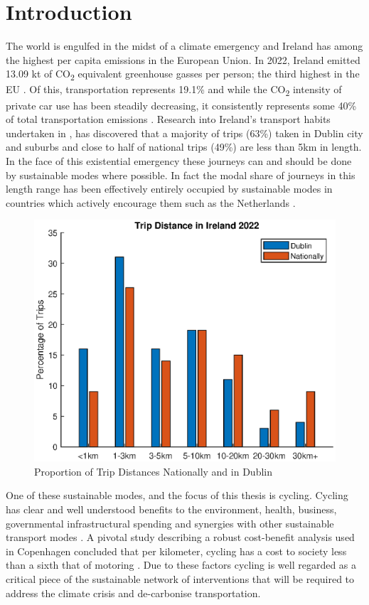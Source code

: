 \chapter{Introduction}

The world is engulfed in the midst of a climate emergency and Ireland has among the highest per capita emissions in the European Union. In 2022, Ireland emitted 13.09 kt of CO\textsubscript{2} equivalent greenhouse gasses per person; the third highest in the EU \citep{eeaEEAGreenhouseGases2024}. Of this, transportation represents 19.1\% and while the CO\textsubscript{2} intensity of private car use has been steadily decreasing, it consistently represents some 40\% of total transportation emissions \citep{walshEnergyIreland20202021}. Research into Ireland's transport habits undertaken in \citet{ntaNationalHouseholdTravel2022}, has discovered that a majority of trips (63\%) taken in Dublin city and suburbs and close to half of national trips (49\%) are less than 5km in length. In the face of this existential emergency these journeys can and should be done by sustainable modes where possible. In fact the modal share of journeys in this length range has been effectively entirely occupied by sustainable modes in countries which actively encourage them such as the Netherlands \citep{tonCyclingWalkingDeterminants2019}.

\begin{figure}[hbt!]
    \centering
    \includegraphics[width=0.60\linewidth]{figures/Irish_trip_distance.eps}
    \caption{Proportion of Trip Distances Nationally and in Dublin \citep{ntaNationalHouseholdTravel2022}}
    \label{fig:TripDistances}
\end{figure}

One of these sustainable modes, and the focus of this thesis is cycling. Cycling has clear and well understood benefits to the environment, health, business, governmental infrastructural spending and synergies with other sustainable transport modes \citep{fraserCyclingTransportPublic2011,kagerCharacterisationReflectionsSynergy2016, dehartogHealthBenefitsCycling2010}. A pivotal study describing a robust cost-benefit analysis used in Copenhagen concluded that per kilometer, cycling has a cost to society less than a sixth that of motoring \citep{gosslingTransportTransitionsCopenhagen2015}. Due to these factors cycling is well regarded as a critical piece of the sustainable network of interventions that will be required to address the climate crisis and de-carbonise transportation.


